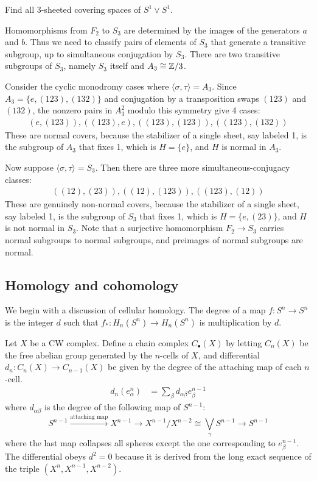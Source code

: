 \documentclass[12pt]{article}
\begin{document}
\begin{exercise}
    Find all 3-sheeted covering spaces of $S^1\vee S^1$.
\end{exercise}

\begin{solution}
    Homomorphisms from $F_2$ to $S_3$ are determined by the images of the generators $a$ and $b$. Thus we need to classify pairs of elements of $S_3$ that generate a transitive subgroup, up to simultaneous conjugation by $S_3$. There are two transitive subgroups of $S_3$, namely $S_3$ itself and $A_3\cong \mathbb{Z}/3$.

    Consider the cyclic monodromy cases where $\langle \sigma,\tau\rangle=A_3$. Since $A_3=\{e,(123),(132)\}$ and conjugation by a transposition swaps $(123)$ and $(132)$, the nonzero pairs in $A_3^2$ modulo this symmetry give 4 cases:
    \begin{align*}
        (e,(123)), ((123),e), ((123),(123)), ((123),(132))
    \end{align*}
    These are normal covers, because the stabilizer of a single sheet, say labeled 1, is the subgroup of $A_3$ that fixes 1, which is $H = \{e\}$, and $H$ is normal in $A_3$.

    Now suppose $\langle \sigma,\tau\rangle=S_3$. Then there are three more simultaneous-conjugacy classes:
    \begin{align*}
        ((12),(23)), ((12),(123)),((123),(12))
    \end{align*}
    These are genuinely non-normal covers, because the stabilizer of a single sheet, say labeled 1, is the subgroup of $S_3$ that fixes 1, which is $H = \{e,(23)\}$, and $H$ is not normal in $S_3$. Note that a surjective homomorphism $F_2 \to S_3$ carries normal subgroups to normal subgroups, and preimages of normal subgroups are normal.
\end{solution}

\subsection{Homology and cohomology}

We begin with a discussion of cellular homology. The degree of a map $f : S^n \to S^n$ is the integer $d$ such that $f_* : H_n(S^n) \to H_n(S^n)$ is multiplication by $d$.

Let $X$ be a CW complex. Define a chain complex $C_\bullet(X)$ by letting $C_n(X)$ be the free abelian group generated by the $n$-cells of $X$, and differential $d_n : C_n(X) \to C_{n-1}(X)$ be given by the degree of the attaching map of each $n$-cell. \begin{align*}
    d_n(e^n_\alpha) & = \sum_\beta d_{\alpha\beta} e^{n-1}_\beta
\end{align*} where $d_{\alpha\beta}$ is the degree of the following map of $S^{n-1}$:
\[S^{n-1} \xrightarrow{\text{attaching map}} X^{n-1} \to X^{n-1}/X^{n-2} \cong \bigvee_{\gamma} S^{n-1} \to S^{n-1}\] where the last map collapses all spheres except the one corresponding to $e^{n-1}_\beta$. The differential obeys $d^2 = 0$ because it is derived from the long exact sequence of the triple $(X^n,X^{n-1},X^{n-2})$.
\end{document}
